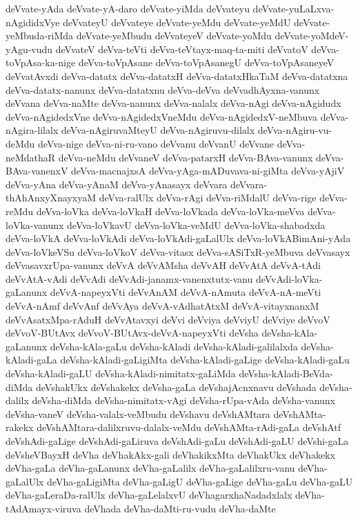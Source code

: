 {deVvate-yAda
deVvate-yA-daro
deVvate-yiMda
deVvateyu
deVvate-yuLaLxva-nAgididxVye
deVvateyU
deVvateye
deVvate-yeMdu
deVvate-yeMdU
deVvate-yeMbuda-riMda
deVvate-yeMbudu
deVvateyeV
deVvate-yoMdu
deVvate-yoMdeV-yAgu-vudu
deVvateV
deVva-teVti
deVva-teVtayx-maq-ta-miti
deVvatoV
deVva-toVpAsa-ka-nige
deVva-toVpAsane
deVva-toVpAsanegU
deVva-toVpAsaneyeV
deVvatAvxdi
deVva-datatx
deVva-datatxH
deVva-datatxHkaTaM
deVva-datatxna
deVva-datatx-nanunx
deVva-datatxnu
deVva-deVva
deVvadhAyxna-vanunx
deVvana
deVva-naMte
deVva-nanunx
deVva-nalalx
deVva-nAgi
deVva-nAgidudx
deVva-nAgidedxVne
deVva-nAgidedxVneMdu
deVva-nAgidedxV-neMbuva
deVva-nAgira-lilalx
deVva-nAgiruvaMteyU
deVva-nAgiruvu-dilalx
deVva-nAgiru-vu-deMdu
deVva-nige
deVva-ni-ru-vano
deVvanu
deVvanU
deVvane
deVva-neMdathaR
deVva-neMdu
deVvaneV
deVva-patarxH
deVva-BAva-vanunx
deVva-BAva-vanenxV
deVva-macnajxsA
deVva-yAga-mADuvava-ni-giMta
deVva-yAjiV
deVva-yAna
deVva-yAnaM
deVva-yAnasayx
deVvara
deVvara-thAhAnxyXnayxyaM
deVva-ralUlx
deVva-rAgi
deVva-riMdalU
deVva-rige
deVva-reMdu
deVva-loVka
deVva-loVkaH
deVva-loVkada
deVva-loVka-meVva
deVva-loVka-vanunx
deVva-loVkavU
deVva-loVka-veMdU
deVva-loVka-shabadxda
deVva-loVkA
deVva-loVkAdi
deVva-loVkAdi-gaLalUlx
deVva-loVkABimAni-yAda
deVva-loVkeVSu
deVva-loVkoV
deVva-vitasx
deVva-sASiTxR-yeMbuva
deVvasayx
deVvasavxrUpa-vanunx
deVvA
deVvAMsha
deVvAH
deVvAtA
deVvA-tAdi
deVvAtA-vAdi
deVvAdi
deVvAdi-janamx-vanenxtutx-vanu
deVvAdi-loVka-gaLanunx
deVvA-napeyxVti
deVvAnAM
deVvA-nAmuta
deVvA-nA-meVti
deVvA-nAmf
deVvAnf
deVvAya
deVvA-vAdhatAtxM
deVvA-vitayxnanxM
deVvAsatxMpa-rAduH
deVvAtavxyi
deVvi
deVviya
deVviyU
deVviye
deVvoV
deVvoV-BUtAvx
deVvoV-BUtAvx-deVvA-napeyxVti
deVsha
deVsha-kAla-gaLanunx
deVsha-kAla-gaLu
deVsha-kAladi
deVsha-kAladi-galilalxda
deVsha-kAladi-gaLa
deVsha-kAladi-gaLigiMta
deVsha-kAladi-gaLige
deVsha-kAladi-gaLu
deVsha-kAladi-gaLU
deVsha-kAladi-nimitatx-gaLiMda
deVsha-kAladi-BeVda-diMda
deVshakUkx
deVshakekx
deVsha-gaLa
deVshajAcnxnavu
deVshada
deVsha-dalilx
deVsha-diMda
deVsha-nimitatx-vAgi
deVsha-rUpa-vAda
deVsha-vanunx
deVsha-vaneV
deVsha-valalx-veMbudu
deVshavu
deVshAMtara
deVshAMta-rakekx
deVshAMtara-dalilxruvu-dalalx-veMdu
deVshAMta-rAdi-gaLa
deVshAtf
deVshAdi-gaLige
deVshAdi-gaLiruva
deVshAdi-gaLu
deVshAdi-gaLU
deVshi-gaLa
deVsheVBayxH
deVha
deVhakAkx-gali
deVhakikxMta
deVhakUkx
deVhakekx
deVha-gaLa
deVha-gaLanunx
deVha-gaLalilx
deVha-gaLalilxru-vanu
deVha-gaLalUlx
deVha-gaLigiMta
deVha-gaLigU
deVha-gaLige
deVha-gaLu
deVha-gaLU
deVha-gaLeraDa-ralUlx
deVha-gaLelalxvU
deVhagarxhaNadadxlalx
deVha-tAdAmayx-viruva
deVhada
deVha-daMti-ru-vudu
deVha-daMte
}
